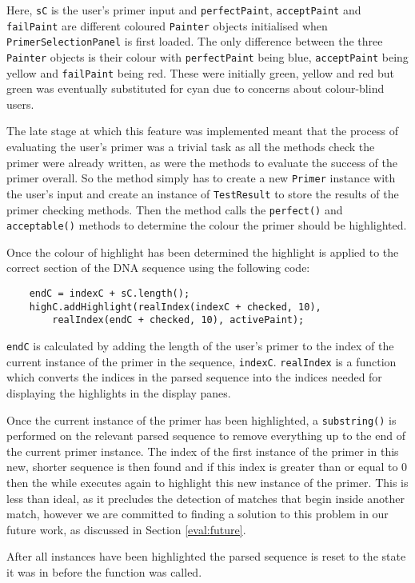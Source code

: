 Here, \texttt{sC} is the user's primer input and \texttt{perfectPaint},
\texttt{acceptPaint} and \texttt{failPaint} are different coloured
\texttt{Painter} objects initialised when \texttt{PrimerSelectionPanel}
is first loaded. The only difference between the three \texttt{Painter}
objects is their colour with \texttt{perfectPaint} being blue,
\texttt{acceptPaint} being yellow and \texttt{failPaint} being red.
These were initially green, yellow and red but green was eventually
substituted for cyan due to concerns about colour-blind users.

The late stage at which this feature was implemented meant that the
process of evaluating the user's primer was a trivial task as all the
methods check the primer were already written, as were the methods to
evaluate the success of the primer overall. So the method simply has to
create a new \texttt{Primer} instance with the user's input and create
an instance of \texttt{TestResult} to store the results of the primer
checking methods. Then the method calls the \texttt{perfect()} and
\texttt{acceptable()} methods to determine the colour the primer should
be highlighted.

Once the colour of highlight has been determined the highlight is
applied to the correct section of the DNA sequence using the following
code:

\begin{verbatim}
    endC = indexC + sC.length();
    highC.addHighlight(realIndex(indexC + checked, 10),
        realIndex(endC + checked, 10), activePaint);
\end{verbatim}

\texttt{endC} is calculated by adding the length of the user's primer to
the index of the current instance of the primer in the sequence, 
\texttt{indexC}. \texttt{realIndex} is a function which converts the
indices in the parsed sequence into the indices needed for displaying
the highlights in the display panes.

Once the current instance of the primer has been highlighted, a 
\texttt{substring()} is performed on the relevant parsed sequence to
remove everything up to the end of the current primer instance. The
index of the first instance of the primer in this new, shorter sequence
is then found and if this index is greater than or equal to 0 then the
while executes again to highlight this new instance of the primer. This
is less than ideal, as it precludes the detection of matches that begin
inside another match, however we are committed to finding a solution to
this problem in our future work, as discussed in Section \ref{eval:future}.



After all instances have been highlighted the parsed sequence is reset
to the state it was in before the function was called.











